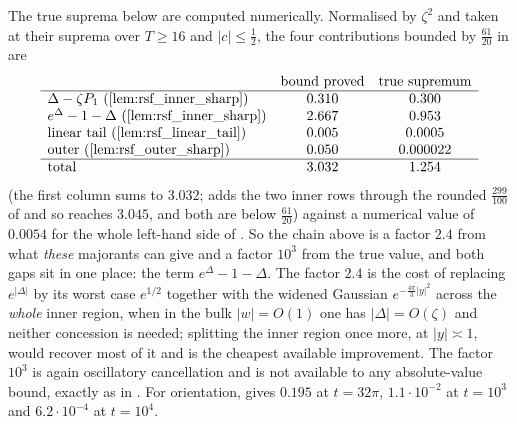 \begin{remark}
\label{rem:rsf_R}
The true suprema below are computed numerically.  Normalised by $\zeta^{2}$ and taken at their suprema over $T\ge16$ and
$\lvert c\rvert\le\tfrac12$, the four contributions bounded by $\tfrac{61}{20}$ in
 are
\[
  \begin{array}{lcc}
    & \text{bound proved} & \text{true supremum}\\\hline
    \Delta-\zeta P_{1}\ (\Cref{lem:rsf_inner_sharp}) & 0.310 & 0.300\\
    e^{\Delta}-1-\Delta\ (\Cref{lem:rsf_inner_sharp}) & 2.667 & 0.953\\
    \text{linear tail }(\Cref{lem:rsf_linear_tail}) & 0.005 & 0.0005\\
    \text{outer }(\Cref{lem:rsf_outer_sharp}) & 0.050 & 0.000022\\\hline
    \text{total} & 3.032 & 1.254
  \end{array}
\]
(the first column sums to $3.032$;  adds the two inner rows through
the rounded $\tfrac{299}{100}$ of  and so reaches $3.045$, and both
are below $\tfrac{61}{20}$)
against a numerical value of $0.0054$ for the whole left-hand side of
.  So the chain above is a factor $2.4$ from what \emph{these} majorants can give and a
factor $10^{3}$ from the true value, and both gaps sit in one place: the term
$e^{\Delta}-1-\Delta$.  The factor $2.4$ is the cost of replacing $e^{\lvert\Delta\rvert}$ by
its worst case $e^{1/2}$ together with the widened Gaussian $e^{-\frac{4\pi}3\lvert y\rvert^{2}}$
across the \emph{whole} inner region, when in the bulk $\lvert w\rvert=O(1)$ one has
$\lvert\Delta\rvert=O(\zeta)$ and neither concession is needed; splitting the inner region once
more, at $\lvert y\rvert\asymp1$, would recover most of it and is the cheapest available
improvement.  The factor $10^{3}$ is again oscillatory cancellation and is not available to any
absolute-value bound, exactly as in .  For orientation,
 gives $0.195$ at $t=32\pi$, $1.1\cdot10^{-2}$ at $t=10^{3}$ and
$6.2\cdot10^{-4}$ at $t=10^{4}$.
\end{remark}

